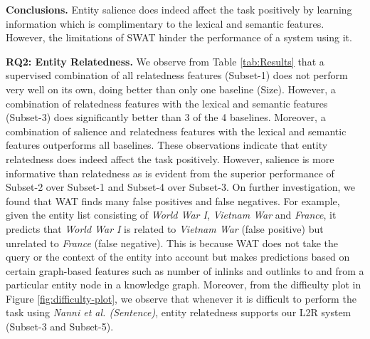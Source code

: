 \documentclass[sigconf,authordraft]{acmart}
\begin{document}
\textbf{Conclusions.}
Entity salience does indeed affect the task positively by learning information which is complimentary to the lexical and semantic features. However, the limitations of SWAT hinder the performance of a system using it.


\textbf{RQ2: Entity Relatedness.}
We observe from Table \ref{tab:Results} that a supervised combination of all relatedness features (Subset-1) does not perform very well on its own, doing better than only one baseline (Size). However, a combination of relatedness features with the lexical and semantic features (Subset-3) does significantly better than 3 of the 4 baselines. Moreover, a combination of salience and relatedness features with the lexical and semantic features outperforms all baselines. 
These observations indicate that entity relatedness does indeed affect the task positively. However, salience is more informative than relatedness as is evident from the superior performance of Subset-2 over Subset-1 and Subset-4 over Subset-3. On further investigation, we found that WAT finds many false positives and false negatives. For example, given the entity list consisting of  \textit{World War I}, \textit{Vietnam War} and \textit{France}, it predicts that \textit{World War I} is related to \textit{Vietnam War} (false positive) but  unrelated to \textit{France} (false negative). This is because WAT does not take the query or the context of the entity into account but makes predictions based on certain graph-based features such as number of inlinks and outlinks to and from a particular entity node in a knowledge graph. Moreover, from the difficulty plot in Figure \ref{fig:difficulty-plot}, we observe that whenever it is difficult to perform the task using \textit{Nanni et al. (Sentence)}, entity relatedness supports our L2R system (Subset-3 and Subset-5).
\end{document}
